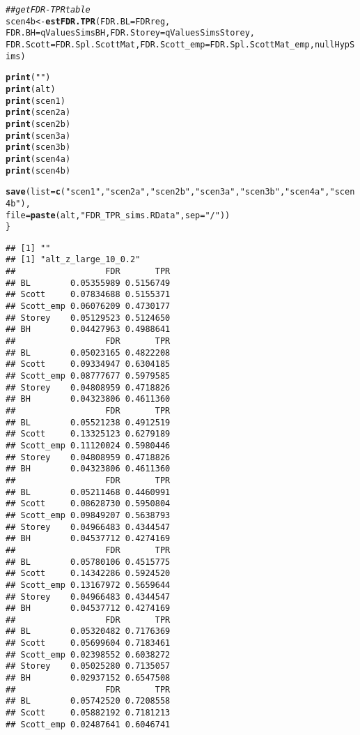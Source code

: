 \documentclass{article}\usepackage[]{graphicx}\usepackage[]{color}
\makeatletter
\newcommand{\hlstr}[1]{\textcolor[rgb]{0.192,0.494,0.8}{#1}}%
\newcommand{\hlcom}[1]{\textcolor[rgb]{0.678,0.584,0.686}{\textit{#1}}}%
\newcommand{\hlstd}[1]{\textcolor[rgb]{0.345,0.345,0.345}{#1}}%
\newcommand{\hlkwb}[1]{\textcolor[rgb]{0.69,0.353,0.396}{#1}}%
\newcommand{\hlkwc}[1]{\textcolor[rgb]{0.333,0.667,0.333}{#1}}%
\newcommand{\hlkwd}[1]{\textcolor[rgb]{0.737,0.353,0.396}{\textbf{#1}}}%
\newenvironment{kframe}{%
 \def\at@end@of@kframe{}%
 \ifinner\ifhmode%
  \def\at@end@of@kframe{\end{minipage}}%
  \begin{minipage}{\columnwidth}%
 \fi\fi%
 \def\FrameCommand##1{\hskip\@totalleftmargin \hskip-\fboxsep
 \colorbox{shadecolor}{##1}\hskip-\fboxsep
     \hskip-\linewidth \hskip-\@totalleftmargin \hskip\columnwidth}%
 \MakeFramed {\advance\hsize-\width
   \@totalleftmargin\z@ \linewidth\hsize
   \@setminipage}}%
 {\par\unskip\endMakeFramed%
 \at@end@of@kframe}
\newenvironment{knitrout}{}{} %
\makeatother
\begin{document}
\begin{knitrout}
\begin{kframe}
\begin{alltt}
  \hlcom{##get FDR-TPR table}
  \hlstd{scen4b} \hlkwb{<-} \hlkwd{estFDR.TPR}\hlstd{(}\hlkwc{FDR.BL} \hlstd{= FDRreg,}
                       \hlkwc{FDR.BH} \hlstd{= qValuesSimsBH,} \hlkwc{FDR.Storey} \hlstd{= qValuesSimsStorey,}
                       \hlkwc{FDR.Scott} \hlstd{= FDR.Spl.ScottMat,} \hlkwc{FDR.Scott_emp} \hlstd{= FDR.Spl.ScottMat_emp, nullHypSims)}

  \hlkwd{print}\hlstd{(}\hlstr{""}\hlstd{)}
  \hlkwd{print}\hlstd{(alt)}
  \hlkwd{print}\hlstd{(scen1)}
  \hlkwd{print}\hlstd{(scen2a)}
  \hlkwd{print}\hlstd{(scen2b)}
  \hlkwd{print}\hlstd{(scen3a)}
  \hlkwd{print}\hlstd{(scen3b)}
  \hlkwd{print}\hlstd{(scen4a)}
  \hlkwd{print}\hlstd{(scen4b)}

  \hlkwd{save}\hlstd{(}\hlkwc{list}\hlstd{=}\hlkwd{c}\hlstd{(}\hlstr{"scen1"}\hlstd{,}\hlstr{"scen2a"}\hlstd{,}\hlstr{"scen2b"}\hlstd{,}\hlstr{"scen3a"}\hlstd{,}\hlstr{"scen3b"}\hlstd{,}\hlstr{"scen4a"}\hlstd{,}\hlstr{"scen4b"}\hlstd{),}
       \hlkwc{file}\hlstd{=}\hlkwd{paste}\hlstd{(alt,}\hlstr{"FDR_TPR_sims.RData"}\hlstd{,}\hlkwc{sep}\hlstd{=}\hlstr{"/"}\hlstd{))}
\hlstd{\}}
\end{alltt}
\begin{verbatim}
## [1] ""
## [1] "alt_z_large_10_0.2"
##                  FDR       TPR
## BL        0.05355989 0.5156749
## Scott     0.07834688 0.5155371
## Scott_emp 0.06076209 0.4730177
## Storey    0.05129523 0.5124650
## BH        0.04427963 0.4988641
##                  FDR       TPR
## BL        0.05023165 0.4822208
## Scott     0.09334947 0.6304185
## Scott_emp 0.08777677 0.5979585
## Storey    0.04808959 0.4718826
## BH        0.04323806 0.4611360
##                  FDR       TPR
## BL        0.05521238 0.4912519
## Scott     0.13325123 0.6279189
## Scott_emp 0.11120024 0.5980446
## Storey    0.04808959 0.4718826
## BH        0.04323806 0.4611360
##                  FDR       TPR
## BL        0.05211468 0.4460991
## Scott     0.08628730 0.5950804
## Scott_emp 0.09849207 0.5638793
## Storey    0.04966483 0.4344547
## BH        0.04537712 0.4274169
##                  FDR       TPR
## BL        0.05780106 0.4515775
## Scott     0.14342286 0.5924520
## Scott_emp 0.13167972 0.5659644
## Storey    0.04966483 0.4344547
## BH        0.04537712 0.4274169
##                  FDR       TPR
## BL        0.05320482 0.7176369
## Scott     0.05699604 0.7183461
## Scott_emp 0.02398552 0.6038272
## Storey    0.05025280 0.7135057
## BH        0.02937152 0.6547508
##                  FDR       TPR
## BL        0.05742520 0.7208558
## Scott     0.05882192 0.7181213
## Scott_emp 0.02487641 0.6046741

\end{verbatim}
\end{kframe}
\end{knitrout}
\end{document}
